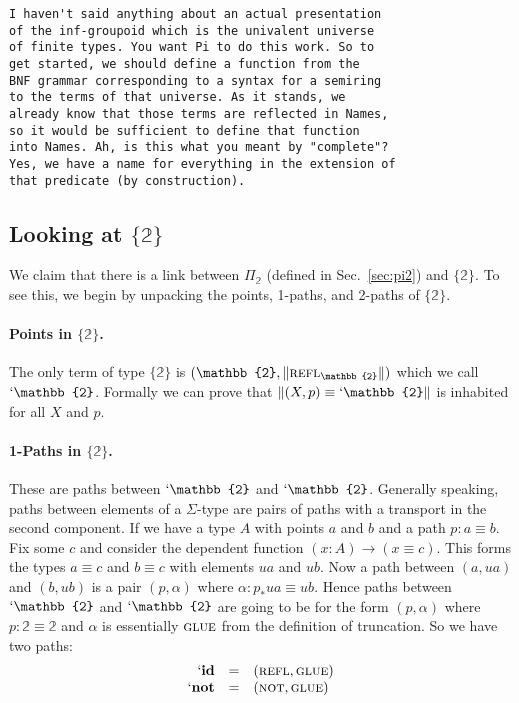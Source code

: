 \documentclass{entcs}
\newcommand{\reflp}{\textsc{refl}}
\newcommand{\notp}{\textsc{not}}
\newcommand{\gluep}{\textsc{glue}}
\newcommand{\bt}{\mathbb{2}}
\newcommand{\bracket}[1]{\ensuremath{\{#1\}}}
\newcommand{\ptrunc}[1]{\ensuremath{\| #1 \|}}
\newcommand{\PiTwo}{\ensuremath{\Pi_{\mathbb{2}}}}
\begin{document}
\begin{verbatim}
I haven't said anything about an actual presentation
of the inf-groupoid which is the univalent universe
of finite types. You want Pi to do this work. So to
get started, we should define a function from the
BNF grammar corresponding to a syntax for a semiring
to the terms of that universe. As it stands, we
already know that those terms are reflected in Names,
so it would be sufficient to define that function
into Names. Ah, is this what you meant by "complete"?
Yes, we have a name for everything in the extension of
that predicate (by construction).

\end{verbatim}

\subsection{Looking at $\bracket{\bt}$}

We claim that there is a link between $\PiTwo$ (defined in Sec.~\ref{sec:pi2})
and $\bracket{\bt}$.  To see this, we begin by unpacking the points, 1-paths,
and 2-paths of $\bracket{\bt}$.

\paragraph*{Points in $\bracket{\bt}$.} The only term of type $\bracket{\bt}$ is
$(\bt,\|\reflp_{\bt}\|)$ which we call $`\bt$. Formally we can prove that
$\ptrunc{(X,p) \equiv `\bt}$ is inhabited for all $X$ and $p$.

\paragraph*{1-Paths in $\{\bt\}$.} These are paths between $`\bt$ and
$`\bt$. Generally speaking, paths between elements of a $\Sigma$-type are pairs
of paths with a transport in the second component. If we have a type $A$ with
points $a$ and $b$ and a path $p : a \equiv b$. Fix some $c$ and consider the
dependent function $(x:A) \rightarrow (x \equiv c)$. This forms the types
$a\equiv c$ and $b\equiv c$ with elements $ua$ and $ub$. Now a path between
$(a,ua)$ and $(b,ub)$ is a pair $(p,\alpha)$ where $\alpha : p_* ua \equiv
ub$. Hence paths between $`\bt$ and $`\bt$ are going to be for the form
$(p,\alpha)$ where $p : \bt \equiv \bt$ and $\alpha$ is essentially $\gluep$
from the definition of truncation. So we have two paths:
\[\begin{array}{rcl}
`\mathbf{id} &=& (\reflp,\gluep) \\
`\mathbf{not} &=& (\notp,\gluep)
\end{array}\]
\end{document}
